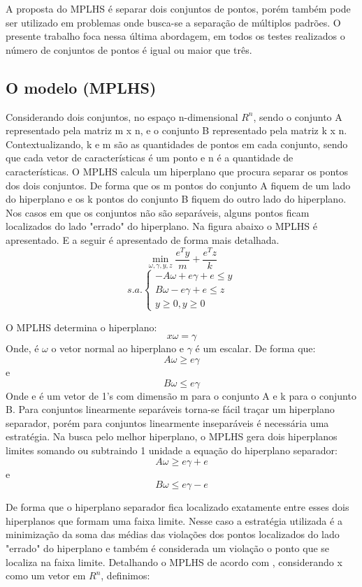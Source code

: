 A proposta do MPLHS é separar dois conjuntos de pontos, porém também pode ser utilizado em problemas onde busca-se a separação de múltiplos padrões. O presente trabalho foca nessa última abordagem, em todos os testes realizados o número de conjuntos de pontos é igual ou maior que três.

\subsection{O modelo (MPLHS)}
Considerando dois conjuntos, no espaço n-dimensional $ R^{n} $, sendo o conjunto A representado pela matriz m x n, e o conjunto B representado pela matriz k x n. Contextualizando, k e m são as quantidades de pontos em cada conjunto, sendo que cada vetor de características é um ponto e n é a quantidade de características. O MPLHS calcula um hiperplano que procura separar os pontos dos dois conjuntos. De forma que os m pontos do conjunto A fiquem de um lado do hiperplano e os k pontos do conjunto B fiquem do outro lado do hiperplano. Nos casos em que os conjuntos não são separáveis, alguns pontos ficam localizados do lado "errado" do hiperplano. Na figura abaixo o MPLHS é apresentado. E a seguir é apresentado de forma mais detalhada.
\newpage
$$\min_{\omega ,\gamma ,y,z}\frac{e^{T}y}{m}+\frac{e^{T}z}{k}$$
$$s.a.\left\{\begin{matrix}-A\omega +e\gamma+e\leq y\\B\omega -e\gamma+e\leq  z\\ y\geq 0,y\geq 0\end{matrix}\right.$$

O MPLHS determina o hiperplano:
$$ x\omega = \gamma $$
Onde,  é $\omega$ o vetor normal ao hiperplano e $\gamma$ é um escalar. De forma que:
$$A\omega \geq e\gamma$$
e
$$B\omega \leq e\gamma$$
Onde e é um vetor de 1’s com dimensão m para o conjunto A e k para o conjunto B.
Para conjuntos linearmente separáveis torna-se fácil traçar um hiperplano separador, porém para conjuntos linearmente inseparáveis é necessária uma estratégia. Na busca pelo melhor hiperplano, o MPLHS gera dois hiperplanos limites somando ou subtraindo 1 unidade a equação do hiperplano separador:
$$A\omega \geq e\gamma + e$$
e
$$B\omega \leq e\gamma - e$$

De forma que o hiperplano separador fica localizado exatamente entre esses dois hiperplanos que formam uma faixa limite.
Nesse caso a estratégia utilizada é a minimização da soma das médias das violações dos pontos localizados do lado "errado" do hiperplano e também é considerada um violação o ponto que se localiza na faixa limite.
Detalhando o MPLHS de acordo com , considerando x como um vetor em $ R^{n} $, definimos:

